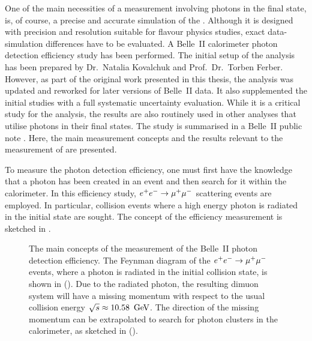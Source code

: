 One of the main necessities of a measurement involving photons in the final state, is, of course, a precise and accurate simulation of the \ECL.
Although it is designed with precision and resolution suitable for flavour physics studies, 
exact data-simulation differences have to be evaluated.
A Belle~II calorimeter photon detection efficiency study has been performed.
The initial setup of the analysis has been prepared by Dr.~Natalia Kovalchuk and Prof.~Dr.~Torben Ferber. 
However, as part of the original work presented in this thesis, the analysis was updated and reworked for later versions of Belle~II data. 
It also supplemented the initial studies with a full systematic uncertainty evaluation.
While it is a critical study for the \BtoXsgamma analysis, the results are also routinely used in other analyses that utilise photons in their final states.
The study is summarised in a Belle~II public note \cite{Henrikas:2604}.
Here, the main measurement concepts and the results relevant to the measurement of \BtoXsgamma are presented.

To measure the photon detection efficiency, one must first have the knowledge that a photon has been created in an event and then search for it within the calorimeter.
In this efficiency study, $e^+e^-\rightarrow\mu^+\mu^-$ scattering events are employed.
In particular, collision events where a high energy photon is radiated in the initial state are sought.
The concept of the efficiency measurement is sketched in .
\begin{figure}[hbtp!]
    \centering
    \caption{\label{fig:photon_efficiency_measurement} The main concepts of the measurement of the Belle~II photon detection efficiency.
    The Feynman diagram of the $e^+e^-\rightarrow\mu^+\mu^-$ events, where a photon is radiated in the initial collision state, is shown in ().
    Due to the radiated photon, the resulting dimuon system will have a missing momentum with respect to the usual collision energy $\sqrt{s}\approx10.58~\mathrm{\,Ge\kern -0.1em V}$.
    The direction of the missing momentum can be extrapolated to search for photon clusters in the calorimeter, as sketched in ().
    }
\end{figure}

